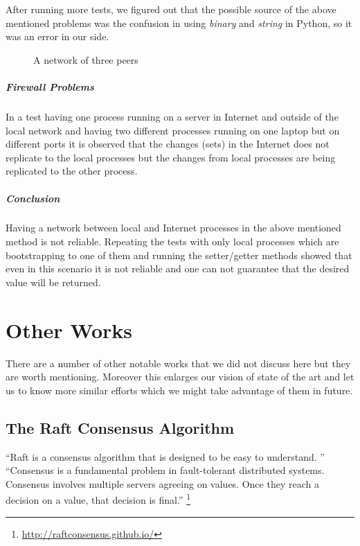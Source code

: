 After running more tests, we figured out that the possible source of the above mentioned problems 
was the confusion in using \textit{binary} and \textit{string} in Python, so it was an error in our side.

\begin{figure}
\centering
{}
\caption{A network of three peers}
\label{fig:threepeers}
\end{figure}


\subparagraph{Firewall Problems}
In a test having one process running on a server in Internet and outside of the local network and having two
different processes running on one laptop but on different ports it is observed that the changes (sets) in the
Internet does not replicate to the local processes but the changes from local processes are being replicated to the other process.

\subparagraph{Conclusion}
Having a network between local and Internet processes in the above mentioned method is not reliable. 
Repeating the tests with only local processes which are bootstrapping to one of them and running the setter/getter
methods showed that even in this scenario it is not reliable and one can not guarantee that the desired value will be returned.

\section{Other Works}
There are a number of other notable works that we did not discuss here but they are worth mentioning.
Moreover this enlarges our vision of state of the art and let us to know more similar efforts 
which we might take advantage of them in future.

\subsection{The Raft Consensus Algorithm}
``Raft\cite{ongaro2014search} is a consensus algorithm that is designed to be easy to understand. ''
``Consensus is a fundamental problem in fault-tolerant distributed systems.
Consensus involves multiple servers agreeing on values. Once they reach a decision on a value, that decision is final.''
\footnote{\url{http://raftconsensus.github.io/}}

